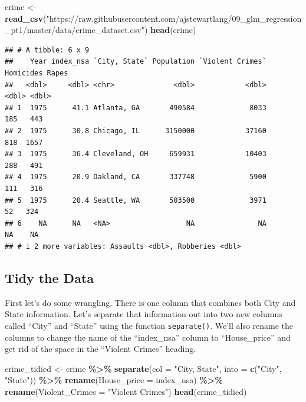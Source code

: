 \documentclass[
]{book}
\newenvironment{Shaded}{\begin{snugshade}}{\end{snugshade}}
\newcommand{\AttributeTok}[1]{\textcolor[rgb]{0.13,0.29,0.53}{#1}}
\newcommand{\FunctionTok}[1]{\textcolor[rgb]{0.13,0.29,0.53}{\textbf{#1}}}
\newcommand{\NormalTok}[1]{#1}
\newcommand{\OtherTok}[1]{\textcolor[rgb]{0.56,0.35,0.01}{#1}}
\newcommand{\SpecialCharTok}[1]{\textcolor[rgb]{0.81,0.36,0.00}{\textbf{#1}}}
\newcommand{\StringTok}[1]{\textcolor[rgb]{0.31,0.60,0.02}{#1}}
\begin{document}
\begin{Shaded}
\begin{Highlighting}[]
\NormalTok{crime }\OtherTok{\textless{}{-}} \FunctionTok{read\_csv}\NormalTok{(}\StringTok{"https://raw.githubusercontent.com/ajstewartlang/09\_glm\_regression\_pt1/master/data/crime\_dataset.csv"}\NormalTok{)}
\FunctionTok{head}\NormalTok{(crime)}
\end{Highlighting}
\end{Shaded}

\begin{verbatim}
## # A tibble: 6 x 9
##    Year index_nsa `City, State` Population `Violent Crimes` Homicides Rapes
##   <dbl>     <dbl> <chr>              <dbl>            <dbl>     <dbl> <dbl>
## 1  1975      41.1 Atlanta, GA       490584             8033       185   443
## 2  1975      30.8 Chicago, IL      3150000            37160       818  1657
## 3  1975      36.4 Cleveland, OH     659931            10403       288   491
## 4  1975      20.9 Oakland, CA       337748             5900       111   316
## 5  1975      20.4 Seattle, WA       503500             3971        52   324
## 6    NA      NA   <NA>                  NA               NA        NA    NA
## # i 2 more variables: Assaults <dbl>, Robberies <dbl>
\end{verbatim}

\hypertarget{tidy-the-data}{%
\subsection{Tidy the Data}\label{tidy-the-data}}

First let's do some wrangling. There is one column that combines both City and State information. Let's separate that information out into two new columns called ``City'' and ``State'' using the function \texttt{separate()}. We'll also rename the columns to change the name of the ``index\_nsa'' column to ``House\_price'' and get rid of the space in the ``Violent Crimes'' heading.

\begin{Shaded}
\begin{Highlighting}[]
\NormalTok{crime\_tidied }\OtherTok{\textless{}{-}}\NormalTok{ crime }\SpecialCharTok{\%\textgreater{}\%}
  \FunctionTok{separate}\NormalTok{(}\AttributeTok{col =} \StringTok{"City, State"}\NormalTok{, }\AttributeTok{into =} \FunctionTok{c}\NormalTok{(}\StringTok{"City"}\NormalTok{, }\StringTok{"State"}\NormalTok{)) }\SpecialCharTok{\%\textgreater{}\%}
  \FunctionTok{rename}\NormalTok{(}\AttributeTok{House\_price =}\NormalTok{ index\_nsa) }\SpecialCharTok{\%\textgreater{}\%}
  \FunctionTok{rename}\NormalTok{(}\AttributeTok{Violent\_Crimes =} \StringTok{"Violent Crimes"}\NormalTok{)}
\FunctionTok{head}\NormalTok{(crime\_tidied)}
\end{Highlighting}
\end{Shaded}
\end{document}
